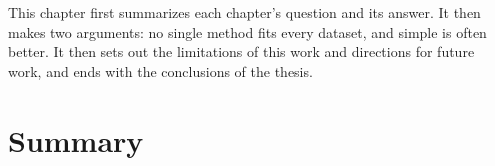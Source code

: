 This chapter first summarizes each chapter's question and its answer. It then makes two arguments: no single method fits every dataset, and simple is often better. It then sets out the limitations of this work and directions for future work, and ends with the conclusions of the thesis. %



\section{Summary}
